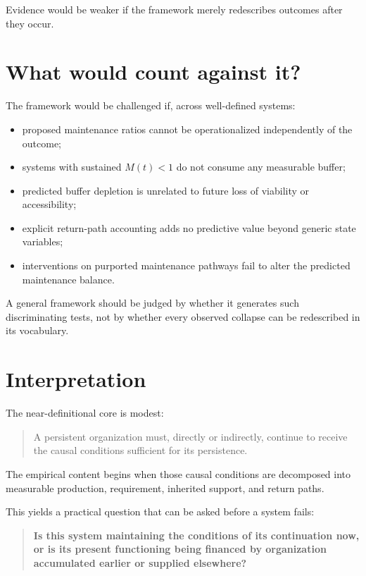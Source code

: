 \documentclass[11pt,a4paper]{article}
\begin{document}
Evidence would be weaker if the framework merely redescribes outcomes after they occur.

\section{What would count against it?}

The framework would be challenged if, across well-defined systems:
\begin{itemize}[nosep]
    \item proposed maintenance ratios cannot be operationalized independently of the outcome;
    \item systems with sustained $M(t)<1$ do not consume any measurable buffer;
    \item predicted buffer depletion is unrelated to future loss of viability or accessibility;
    \item explicit return-path accounting adds no predictive value beyond generic state variables;
    \item interventions on purported maintenance pathways fail to alter the predicted maintenance balance.
\end{itemize}

A general framework should be judged by whether it generates such discriminating tests, not by whether every observed collapse can be redescribed in its vocabulary.

\section{Interpretation}

The near-definitional core is modest:

\begin{quote}
A persistent organization must, directly or indirectly, continue to receive the causal conditions sufficient for its persistence.
\end{quote}

The empirical content begins when those causal conditions are decomposed into measurable production, requirement, inherited support, and return paths.

This yields a practical question that can be asked before a system fails:

\begin{quote}
\textbf{Is this system maintaining the conditions of its continuation now, or is its present functioning being financed by organization accumulated earlier or supplied elsewhere?}
\end{quote}
\end{document}
